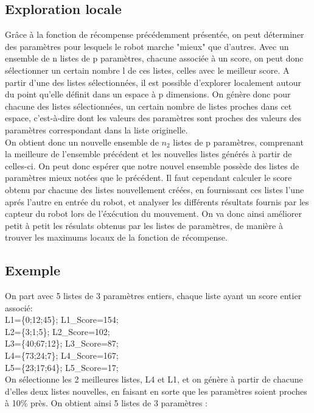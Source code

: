 \documentclass[11pt]{article}
\begin{document}
\subsection{Exploration locale}
Grâce à la fonction de récompense précédemment présentée, on peut déterminer des paramètres pour lesquels le robot marche "mieux" que d'autres. Avec un ensemble de n listes de p paramètres, chacune associée à un score, on peut donc sélectionner un certain nombre l de ces listes, celles avec le  meilleur score. A partir d'une des listes sélectionnées, il est possible d'explorer localement autour du point qu'elle définit dans un espace à p dimensions. On génère donc pour chacune des listes sélectionnées, un certain nombre de listes proches dans cet espace, c'est-à-dire dont les valeurs des paramètres sont proches des valeurs des paramètres correspondant dans la liste originelle.\\
On obtient donc un nouvelle ensemble de $n_2$ listes de p paramètres, comprenant la meilleure de l'ensemble précédent et les nouvelles listes générés à partir de celles-ci. On peut donc espérer que notre nouvel ensemble possède des listes de paramètres mieux notées que le précédent. Il faut cependant calculer le score obtenu par chacune des listes nouvellement créées, en fournissant ces listes l'une aprés l'autre en entrée du robot, et analyser les différents résultats fournis par les capteur du robot lors de l'éxécution du mouvement. On va donc ainsi améliorer petit à petit les résulats obtenus par les listes de paramètres, de manière à trouver les maximums locaux de la fonction de récompense.

\subsection*{Exemple} 
On part avec 5 listes de 3 paramètres entiers, chaque liste ayant un score entier associé:\\
L1=\{0;12;45\}; L1\_Score=154;\\
L2=\{3;1;5\}; L2\_Score=102;\\
L3=\{40;67;12\}; 
L3\_Score=87;\\
L4=\{73;24;7\};  
L4\_Score=167;\\
L5=\{23;17;64\}; 
L5\_Score=17;\\

On sélectionne les 2 meilleures listes, L4 et L1, et on génère à partir de chacune d'elles deux listes nouvelles, en faisant en sorte que les paramètres soient proches à 10\% près. On obtient ainsi 5 listes de 3 paramètres :\\
\end{document}
